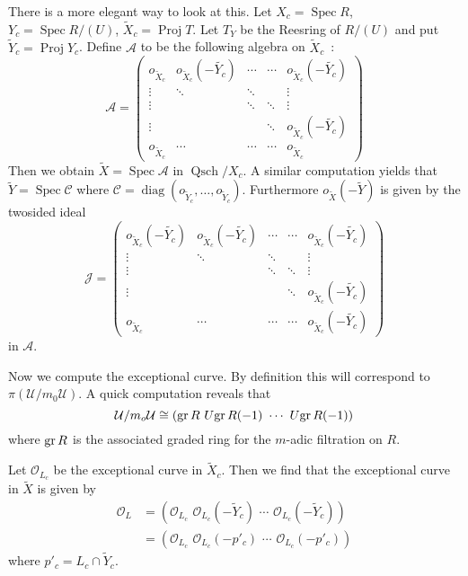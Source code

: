 \documentclass{amsproc}
\def\Ascr{{\mathcal A}}
\def\Cscr{{\mathcal C}}
\def\Jscr{{\mathcal J}}
\def\Oscr{{\mathcal O}}
\def\Uscr{{\mathcal U}}
\def\gr{\mathop{\text{gr}}}
\def\QSch{\operatorname{Qsch}}
\def\gr{\operatorname {gr}}
\def\Spec{\operatorname {Spec}}
\def\diag{\operatorname {diag}}
\def\gr{\operatorname {gr}}
\def\Proj{\operatorname {Proj}}
\let\oldtext\text
\def\text#1{\oldtext{\upshape #1}}
\theoremstyle{definition}
\theoremstyle{remark}
\numberwithin{equation}{section}
\numberwithin{table}{section}
\numberwithin{figure}{section}
\def\gr{\mathop{\text{gr}}}
\begin{document}
There is a more elegant way to look at this. Let $X_c=\Spec R$,
$Y_c=\Spec R/(U)$, $\tilde{X}_c=\Proj T$. Let $T_Y$ be the Reesring of
$R/(U)$ and put $\tilde{Y}_c=\Proj Y_c$. Define $\Ascr$ to be the following
algebra on $\tilde{X}_c$~:
\[
\Ascr=
\begin{pmatrix}
o_{\tilde{X}_c}          &o_{\tilde{X}_c}(-\tilde{Y_c})        &\cdots   &\cdots   &o_{\tilde{X}_c}(-\tilde{Y_c})       \\
\vdots     &\ddots     &\ddots   &         &\vdots   \\
\vdots     &           &\ddots   &\ddots   &\vdots   \\
\vdots     &           &         &\ddots   & o_{\tilde{X}_c}(-\tilde{Y_c})  \\
o_{\tilde{X}_c}          &\cdots     &\cdots   &\cdots   &o_{\tilde{X}_c}    
\end{pmatrix}
\]
Then we obtain $\tilde{X}=\Spec \Ascr$ in $\QSch/X_c$.  A similar
computation yields that $\tilde{Y}=\Spec \Cscr$ where
$\Cscr=\diag(o_{\tilde{Y}_c},\ldots, o_{\tilde{Y}_c})$. Furthermore
$o_{\tilde{X}}(-\tilde{Y})$ is given by the twosided ideal 
\begin{equation}
\label{ref:6.38a}
\Jscr=\begin{pmatrix}
  o_{\tilde{X}_c} (-\tilde{Y_c}) &o_{\tilde{X}_c}(-\tilde{Y_c})
  &\cdots &\cdots &o_{\tilde{X}_c}(-\tilde{Y_c}) \\ \vdots &\ddots
  &\ddots & &\vdots \\ \vdots & &\ddots &\ddots &\vdots \\ \vdots & &
  &\ddots & o_{\tilde{X}_c}(-\tilde{Y_c}) \\ o_{\tilde{X}_c} &\cdots
  &\cdots &\cdots &o_{\tilde{X}_c}(-\tilde{Y_c})
\end{pmatrix}
\end{equation}
in $\Ascr$.

Now we compute the exceptional curve. By definition this will
correspond to $\pi(\Uscr/m_0\Uscr)$. A quick computation reveals that
\[
\Uscr/m_o\Uscr\cong (\gr R\,\, U\!\gr R(-1)\,\,\cdots\,\, U\!\gr R(-1))
\]
where $\gr R$ is the associated graded ring for the $m$-adic
filtration on $R$.

Let $\Oscr_{L_c}$ be the exceptional curve in $\tilde{X}_c$. Then we find
that the exceptional curve in $\tilde{X}$ is given by
\begin{equation}
\label{ref:6.39a}
\begin{split}
\Oscr_L&=(\Oscr_{L_c} \,\,\Oscr_{L_c}(-\tilde{Y}_c)\,\,\cdots\,\,
\Oscr_{L_c}(-\tilde{Y}_c))\\
&=(\Oscr_{L_c} \,\,\Oscr_{L_c}(-p'_c)\,\,\cdots\,\,
\Oscr_{L_c}(-p'_c))
\end{split}
\end{equation}
where $p'_c=L_c\cap \tilde{Y}_c$.
\end{document}

